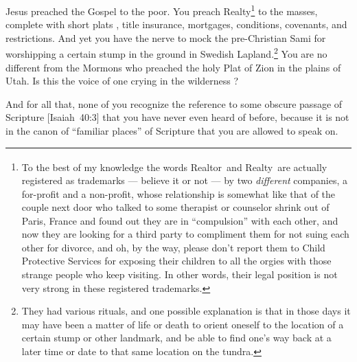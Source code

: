 \documentclass[letterpaper]{article}
\begin{document}
Jesus preached the Gospel to the poor.  You preach Realty\textsuperscript\textregistered\footnote{To the best of my knowledge the words Realtor\textsuperscript\textregistered\ and Realty\textsuperscript\textregistered\ are actually registered as trademarks --- believe it or not --- by two \textit{different} companies, a for-profit and a non-profit, whose relationship is somewhat like that of the couple next door who talked to some therapist or counselor shrink out of Paris, France and found out they are in ``compulsion'' with each other, and now they are looking for a third party to compliment them for not suing each other for divorce, and oh, by the way, please don't report them to Child Protective Services for exposing their children to all the orgies with those strange people who keep visiting.  In other words, their legal position is not very strong in these registered trademarks.}  to the masses, complete with short plats \cite{rcw-58.17.060}, title insurance, mortgages, conditions, covenants, and restrictions.  And yet you have the nerve to mock the pre-Christian Sami for worshipping a certain stump in the ground in Swedish Lapland.\footnote{They had various rituals, and one possible explanation is that in those days it may have been a matter of life or death to orient oneself to the location of a certain stump or other landmark, and be able to find one's way back at a later time or date to that same location on the tundra.}  You are no different from the Mormons who preached the holy Plat of Zion \cite{williams2016revised} in the plains of Utah. Is this the voice of one crying in the wilderness \cite{laestadius1988voice}?

And for all that, none of you recognize the reference to some obscure passage of Scripture [Isaiah~40:3] that you have never even heard of before, because it is not in the canon of ``familiar places'' of Scripture that you are allowed to speak on.
\end{document}
